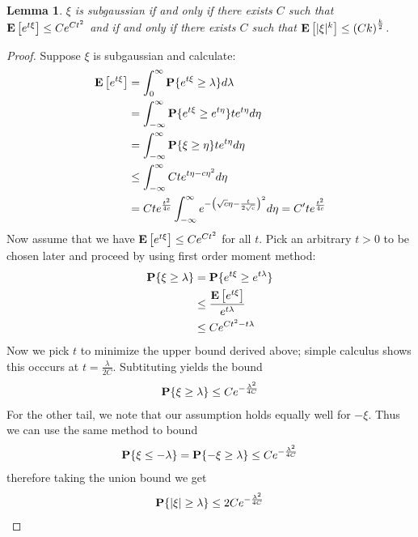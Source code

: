 \documentclass{amsart}
\newtheorem{lem}[thm]{Lemma}
\theoremstyle{remark}
\theoremstyle{definition}
\begin{document}
\begin{lem}\label{SubgaussianEquivalence}$\xi$ is subgaussian if and only if there exists $C$ such
  that $\textbf{E}\left[e^{t\xi}\right] \leq C e^{Ct^2}$ and if and only if
    there exists $C$ such that $\textbf{E}\left[|\xi|^k\right] \leq \left(Ck\right)^{\frac{k}{2}}$.
\end{lem}
\begin{proof}
Suppose $\xi$ is subgaussian and calculate:
\begin{align*}
\textbf{E}\left[e^{t\xi}\right] &= \int_0^\infty \textbf{P}\{e^{t\xi} \geq
    \lambda\} d\lambda \\
&= \int_{-\infty}^\infty \textbf{P}\{e^{t\xi} \geq e^{t\eta}\} t
e^{t\eta} d\eta \\
& = \int_{-\infty}^\infty \textbf{P}\{\xi \geq \eta\} t
e^{t\eta} d\eta \\
& \leq \int_{-\infty}^\infty C t
e^{t\eta - c\eta^2} d\eta  \\
& = C t e^{\frac{t^2}{4c}}\int_{-\infty}^\infty 
e^{-\left(\sqrt{c}\eta - \frac{t}{2\sqrt{c}}\right)^2} d\eta =
C^\prime t e^{\frac{t^2}{4c}}
\end{align*}
Now assume that we have $\textbf{E}\left[e^{t\xi}\right] \leq C e^{Ct^2}$ for
all $t$.  Pick an arbitrary $t>0$ to be
chosen later and proceed by using first order
moment method:
\begin{align*}
\textbf{P}\{\xi \geq \lambda\} &= \textbf{P}\{e^{t\xi} \geq
  e^{t\lambda}\} \\
&\leq \frac{\textbf{E}\left[e^{t\xi}\right]}{e^{t\lambda}} \\
&\leq C e^{Ct^2 - t\lambda} \\
\end{align*}
Now we pick $t$ to minimize the upper bound derived above; simple
calculus shows this occcurs at $t=\frac{\lambda}{2C}$.  Subtituting
yields the bound 
\begin{align*}
\textbf{P}\{\xi \geq \lambda\} \leq C e ^ {-\frac{\lambda^2}{4C}}
\end{align*}
For the other tail, we note that our assumption holds equally well for
$-\xi$.  Thus we can use the same method to bound 
\begin{align*}
\textbf{P}\{\xi \leq -\lambda\} = \textbf{P}\{-\xi \geq \lambda\} \leq C e ^ {-\frac{\lambda^2}{4C}}
\end{align*}
therefore taking the union bound we get
\begin{align*}
\textbf{P}\{|\xi| \geq \lambda\} \leq 2 C e ^ {-\frac{\lambda^2}{4C}}
\end{align*}


\end{proof}
\end{document}
